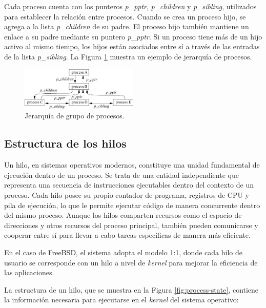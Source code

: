 Cada proceso cuenta con los punteros \textit{p\_pptr}, \textit{p\_children} y \textit{p\_sibling}, utilizados para establecer la relación entre procesos. Cuando se crea un proceso hijo, se agrega a la lista \textit{p\_children} de su padre. El proceso hijo también mantiene un enlace a su padre mediante su puntero \textit{p\_pptr}. Si un proceso tiene más de un hijo activo al mismo tiempo, los hijos están asociados entre sí a través de las entradas de la lista \textit{p\_sibling}. La Figura \ref{fig:process-hierarchy} muestra un ejemplo de jerarquía de procesos.

\begin{figure}[H]
    \centering
    \includegraphics[width=0.5\textwidth]{./images/process-hierarchy.jpeg}
    \caption{Jerarquía de grupo de procesos.}
    \label{fig:process-hierarchy}
\end{figure}


\subsection{Estructura de los hilos}
Un hilo, en sistemas operativos modernos, constituye una unidad fundamental de ejecución dentro de un proceso. Se trata de una entidad independiente que representa una secuencia de instrucciones ejecutables dentro del contexto de un proceso. Cada hilo posee su propio contador de programa, registros de CPU y pila de ejecución, lo que le permite ejecutar código de manera concurrente dentro del mismo proceso. Aunque los hilos comparten recursos como el espacio de direcciones y otros recursos del proceso principal, también pueden comunicarse y cooperar entre sí para llevar a cabo tareas específicas de manera más eficiente.\par

En el caso de FreeBSD, el sistema adopta el modelo 1:1, donde cada hilo de usuario se corresponde con un hilo a nivel de \textit{kernel} para mejorar la eficiencia de las aplicaciones.\par

La estructura de un hilo, que se muestra en la Figura \ref{fig:process-state}, contiene la información necesaria para ejecutarse en el \textit{kernel} del sistema operativo:

